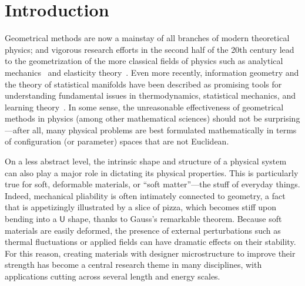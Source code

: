 
\chapter{Introduction}


Geometrical methods are now a mainstay of all branches of modern theoretical physics;
and vigorous research efforts in the second half of the 20th century lead to the geometrization of the more classical fields of physics such as analytical mechanics~\cite{sudarshan1974,arnold1978,souder2017} and elasticity theory~\cite{marsden1994,audoly2010}.
Even more recently, information geometry and the theory of statistical manifolds have been described as promising tools for understanding fundamental issues in thermodynamics, statistical mechanics, and learning theory~\cite{ruppeiner1995}.
In some sense, the unreasonable effectiveness of geometrical methods in physics (among other mathematical sciences) should not be surprising---after all, many physical problems are best formulated mathematically in terms of configuration (or parameter) spaces that are not Euclidean.

On a less abstract level, the intrinsic shape and structure of a physical system can also play a major role in dictating its physical properties.
This is particularly true for soft, deformable materials, or ``soft matter''---the stuff of everyday things.
Indeed, mechanical pliability is often intimately connected to geometry, a fact that is appetizingly illustrated by a slice of pizza, which becomes stiff upon bending into a $\textsf{U}$ shape, thanks to Gauss's remarkable theorem.
Because soft materials are easily deformed, the presence of external perturbations such as thermal fluctuations or applied fields can have dramatic effects on their stability.
For this reason, creating materials with designer microstructure to improve their strength has become a central research theme in many disciplines, with applications cutting across several length and energy scales.

